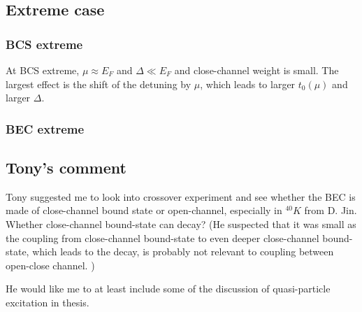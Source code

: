 \subsection{Extreme case}
\subsubsection{BCS extreme}
At BCS extreme, $\mu\approx{E_{F}}$ and $\Delta\ll{}E_{F}$ and close-channel weight is small.  The largest effect is the shift of the detuning by $\mu$, which leads to larger $t_{0}(\mu)$ and larger $\Delta$. 

\subsubsection{BEC extreme}
\subsection{Tony's comment}
Tony suggested me to look into crossover experiment and see whether the BEC is made of close-channel bound state or open-channel, especially in $^{40}K$ from D. Jin.   Whether close-channel bound-state can decay? (He suspected that it was small as the coupling from close-channel bound-state to even deeper close-channel bound-state, which leads to the decay, is probably not relevant to coupling between open-close channel. )

He would like me to at least include some of the discussion of quasi-particle excitation in thesis.  